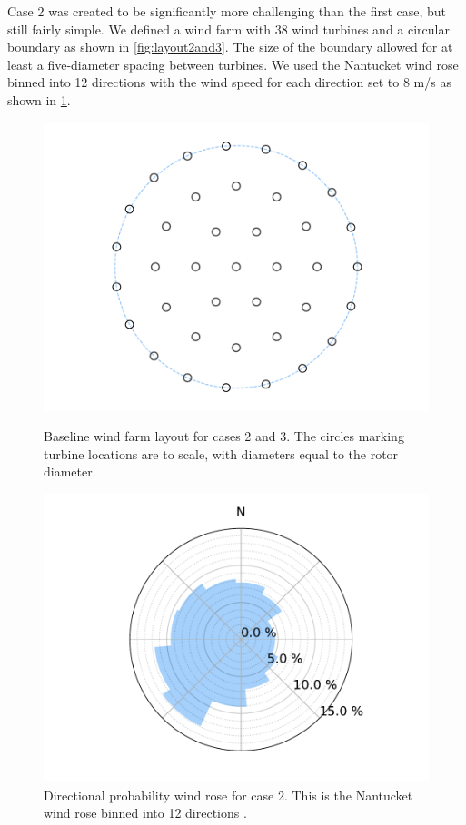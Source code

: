 \documentclass{jpconf}
\begin{document}
  Case 2 was created to be significantly more challenging than the first case, but still fairly simple. We defined a wind farm with 38 wind turbines and a circular boundary as shown in \cref{fig:layout2and3}. The size of the boundary allowed for at least a five-diameter spacing between turbines. We used the Nantucket wind rose binned into 12 directions with the wind speed for each direction set to 8 m/s as shown in \cref{fig:freqwindrose_12dir}.
%
\begin{figure}[h!]
	\centering
	\begin{minipage}[t]{18pc}
		\centering
		\includegraphics[width=\textwidth, trim={1.5cm, 0cm, 1.5cm, 0cm}, clip]{final_images/layouts/38_turb_start.pdf}
		\caption{Baseline wind farm layout for cases 2 and 3. The circles marking turbine locations are to scale, with diameters equal to the rotor diameter.}
		\label{fig:layout2and3}
	\end{minipage} \hspace{1pc}
	\begin{minipage}[t]{18pc}
		\centering
		\includegraphics[width=\textwidth, trim={1.5cm 0cm 1.5cm 0cm}, clip]{final_images/windroses/freqwindrose_12_dir.pdf}
		\caption{Directional probability wind rose for case 2. This is the Nantucket wind rose binned into 12 directions \cite{wrcc2017}.}
		\label{fig:freqwindrose_12dir}
	\end{minipage}
\end{figure}
\end{document}
